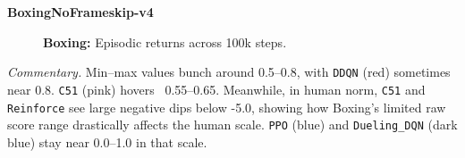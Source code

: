 \noindent
\textbf{BoxingNoFrameskip-v4}
\begin{figure}[htbp]
	\centering
	\quad
	\caption{\textbf{Boxing:} Episodic returns across 100k steps.}
	\label{fig:boxing_comparison_combined}
\end{figure}

\noindent
\emph{Commentary.} 
Min--max values bunch around 0.5--0.8, with \texttt{DDQN} (red) sometimes near 0.8. 
\texttt{C51} (pink) hovers ~0.55--0.65. Meanwhile, in human norm, 
\texttt{C51} and \texttt{Reinforce} see large negative dips below -5.0, 
showing how Boxing’s limited raw score range drastically affects the human scale. 
\texttt{PPO} (blue) and \texttt{Dueling\_DQN} (dark blue) stay near 0.0--1.0 
in that scale.

\bigskip

